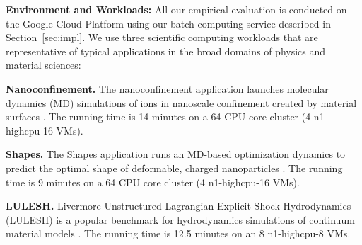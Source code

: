 \noindent \textbf{Environment and Workloads:}
All our empirical evaluation is conducted on the Google Cloud Platform using our batch computing service described in Section~\ref{sec:impl}. 
We use three scientific computing workloads that are representative of typical applications in the broad domains of physics and material sciences:%


\noindent \textbf{Nanoconfinement.}
The nanoconfinement application launches molecular dynamics (MD) simulations of ions in nanoscale confinement created by material surfaces \cite{jing2015ionic,kadupitiya2017}. The running time is 14 minutes on a 64 CPU core cluster (4 n1-highcpu-16 VMs). 

\noindent \textbf{Shapes.} The Shapes application runs an MD-based optimization dynamics to predict the optimal shape of deformable, charged nanoparticles \cite{jto1,brunk2019computational}. The running time is 9 minutes on a 64 CPU core cluster (4 n1-highcpu-16 VMs). 

\noindent \textbf{LULESH.} Livermore Unstructured Lagrangian Explicit Shock Hydrodynamics (LULESH)  is a popular benchmark for hydrodynamics simulations of continuum material models \cite{IPDPS13:LULESH,LULESH2:changes}. The running time is 12.5 minutes on an 8 n1-highcpu-8 VMs.






